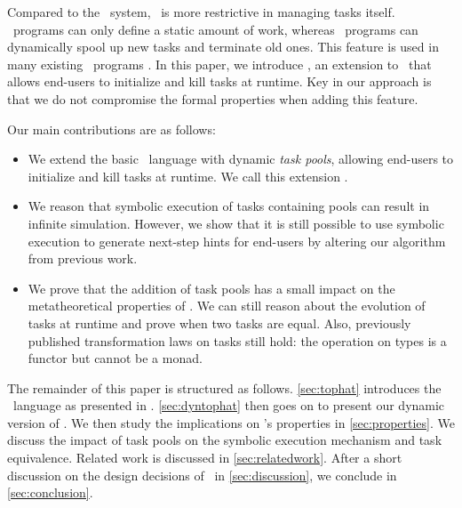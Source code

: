 Compared to the \ITASKS\ system, \TOPHAT\ is more restrictive in managing tasks itself.
\TOPHAT\ programs can only define a static amount of work, whereas \ITASKS\ programs can dynamically spool up new tasks and terminate old ones.
This feature is used in many existing \ITASKS\ programs \cite{conf/iscram/JansenLP10,conf/iscram/LijnseJNP11,com/tss/viia}.
In this paper, we introduce \DYNTOPHAT, an extension to \TOPHAT\ that allows end-users to initialize and kill tasks at runtime.
Key in our approach is that we do not compromise the formal properties when adding this feature.


Our main contributions are as follows:
\begin{itemize}
  \item
    We extend the basic \TOPHAT\ language with dynamic \emph{task pools},
    allowing end-users to initialize and kill tasks at runtime.
    We call this extension \DYNTOPHAT.
  \item
    We reason that symbolic execution of tasks containing pools can result in infinite simulation.
    However, we show that it is still possible to use symbolic execution to generate next-step hints for end-users
    by altering our algorithm from previous work.
  \item
    We prove that the addition of task pools has a small impact on the metatheoretical properties of \TOPHAT.
    We can still reason about the evolution of tasks at runtime
    and prove when two tasks are equal.
    Also, previously published transformation laws on tasks still hold:
    the  operation on types is a functor but cannot be a monad.
\end{itemize}



The remainder of this paper is structured as follows.
\cref{sec:tophat} introduces the \TOPHAT\ language as presented in \citet{Steenvoorden22}.
\cref{sec:dyntophat} then goes on to present our dynamic version of \TOPHAT.
We then study the implications on \TOPHAT's properties in \cref{sec:properties}.
We discuss the impact of task pools on the symbolic execution mechanism and task equivalence.
Related work is discussed in \cref{sec:relatedwork}.
After a short discussion on the design decisions of \DYNTOPHAT\ in \cref{sec:discussion},
we conclude in \cref{sec:conclusion}.

